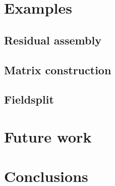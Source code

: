 \documentclass[thesis]{subfiles}
\begin{document}
  \section{Examples}

  \subsection{Residual assembly}

  \subsection{Matrix construction}

  \subsection{Fieldsplit}



  \section{Future work}


  \section{Conclusions}
\end{document}
